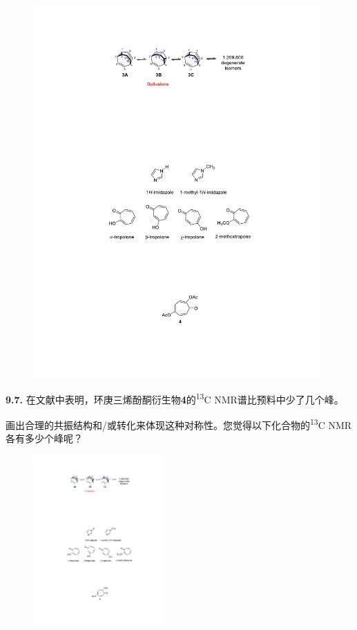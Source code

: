\begin{figure}[h]
	\centering
	\includegraphics[width=11cm]{./pic/t9-3.pdf}
\end{figure}

\newpage\noindent\textbf{9.7.}
在文献中表明，环庚三烯酚酮衍生物\textbf{4}的\textsuperscript{13}C NMR谱比预料中少了几个峰。

画出合理的共振结构和/或转化来体现这种对称性。您觉得以下化合物的\textsuperscript{13}C NMR各有多少个峰呢？

\begin{figure}[h]
	\centering
	\includegraphics[width=5cm]{./pic/t9-4.pdf}
\end{figure}


